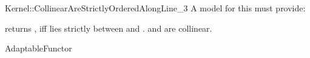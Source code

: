 \begin{ccRefFunctionObjectConcept}{Kernel::CollinearAreStrictlyOrderedAlongLine_3}
A model for this must provide:


         {returns , iff  lies strictly between 
          and . \ccPrecond {} and 
          are collinear.}

\ccRefines
AdaptableFunctor

\ccSeeAlso

  \\


\end{ccRefFunctionObjectConcept}
